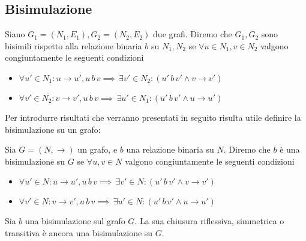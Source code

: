 \subsection{Bisimulazione}
\begin{definition}
    Siano $G_1 = (N_1, E_1), G_2 = (N_2, E_2)$ due grafi. Diremo che $G_1, G_2$ sono bisimili \cite{dovier} rispetto alla relazione binaria $b$ su $N_1, N_2$ se $\forall u \in N_1, v \in N_2$ valgono congiuntamente le seguenti condizioni
    \begin{itemize}
        \item $\forall u' \in N_1 : u \to u', u \,b\, v \implies \,\exists v' \in N_2 : (u' \,b\, v' \land v \to v')$
        \item $\forall v' \in N_2 : v \to v', u \,b\, v \implies \,\exists u' \in N_1 : (u' \,b\, v' \land u \to u')$
    \end{itemize}
\end{definition}
Per introdurre risultati che verranno presentati in seguito risulta utile definire la bisimulazione su un grafo:
\begin{definition}
    Sia $G = (N, \to)$ un grafo, e $b$ una relazione binaria su $N$. Diremo che $b$ è una bisimulazione su $G$ se $\forall u,v \in N$ valgono congiuntamente le seguenti condizioni
    \begin{itemize}
        \item $\forall u' \in N : u \to u', u \,b\, v \implies \,\exists v' \in N : (u' \,b\, v' \land v \to v')$
        \item $\forall v' \in N : v \to v', u \,b\, v \implies \,\exists u' \in N : (u' \,b\, v' \land u \to u')$
    \end{itemize}
\end{definition}
\begin{proposition}
    Sia $b$ una bisimulazione sul grafo $G$. La sua chiusura riflessiva, simmetrica o transitiva è ancora una bisimulazione su $G$.
\end{proposition}
